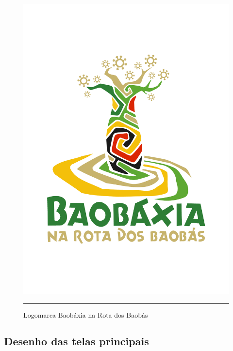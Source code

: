 \begin{itemize}
\begin{figure}[htbp]
  \centering
  \includegraphics[width=\textwidth]{./Fig/Logo_BBX_Na_Rota.pdf}
  \rule{35em}{0.5pt}
  \caption[Logomarca Baobáxia na Rota dos Baobás]{
    Logomarca Baobáxia na Rota dos Baobás}
  \label{fig:Logo_BBX_Na_Rota}
\end{figure}


\subsection{Desenho das telas principais}


\end{itemize}
